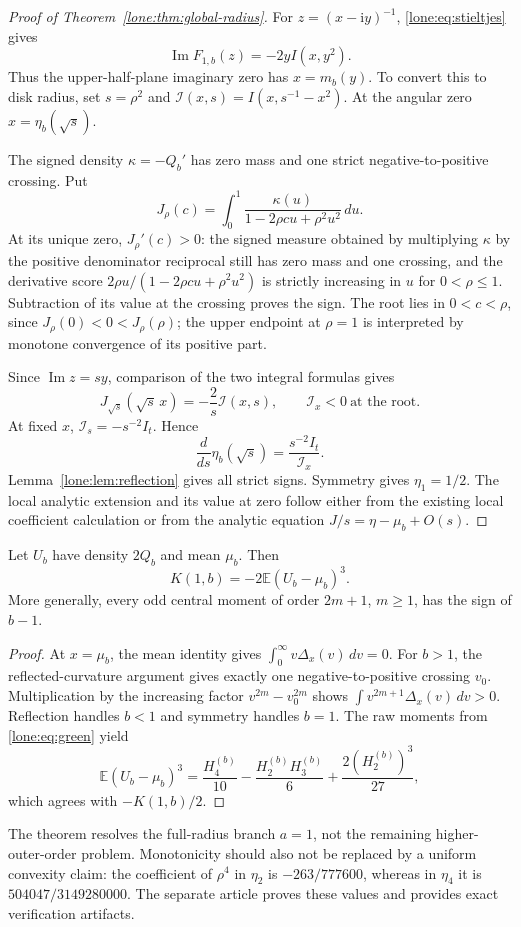 \begin{proof}[Proof of Theorem~\ref{lone:thm:global-radius}]
For $z=(x-\mathrm i y)^{-1}$, \eqref{lone:eq:stieltjes} gives
\[
 \operatorname{Im}F_{1,b}(z)=-2y I(x,y^2).
\]
Thus the upper-half-plane imaginary zero has $x=m_b(y)$.
To convert this to disk radius, set $s=\rho^2$ and
$\mathcal I(x,s)=I(x,s^{-1}-x^2)$. At the angular zero $x=\eta_b(\sqrt s)$.

The signed density $\kappa=-Q_b'$ has zero mass and one strict
negative-to-positive crossing. Put
\[
 J_\rho(c)=\int_0^1\frac{\kappa(u)}{1-2\rho cu+\rho^2u^2}\,du.
\]
At its unique zero, $J_\rho'(c)>0$: the signed measure obtained by
multiplying $\kappa$ by the positive denominator reciprocal still has
zero mass and one crossing, and the derivative score
$2\rho u/(1-2\rho cu+\rho^2u^2)$ is strictly increasing in $u$ for
$0<\rho\le1$. Subtraction of its value at the crossing proves the sign.
The root lies in $0<c<\rho$, since $J_\rho(0)<0<J_\rho(\rho)$;
the upper endpoint at $\rho=1$ is interpreted by monotone convergence
of its positive part.

Since $\operatorname{Im}z=sy$, comparison of the two integral formulas
gives
\[
 J_{\sqrt s}(\sqrt s\,x)=-\frac2s\mathcal I(x,s),
 \qquad \mathcal I_x<0\ \text{at the root}.
\]
At fixed $x$, $\mathcal I_s=-s^{-2}I_t$. Hence
\begin{equation}\label{lone:eq:radial-derivative}
 \frac d{ds}\eta_b(\sqrt s)=\frac{s^{-2}I_t}{\mathcal I_x}.
\end{equation}
Lemma~\ref{lone:lem:reflection} gives all strict signs. Symmetry gives
$\eta_1=1/2$. The local analytic extension and its value at zero follow
either from the existing local coefficient calculation or from the
analytic equation $J/s=\eta-\mu_b+O(s)$.
\end{proof}

\begin{corollary}
\label{lone:cor:moment}
Let $U_b$ have density $2Q_b$ and mean $\mu_b$. Then
\[
 K(1,b)=-2\mathbb E(U_b-\mu_b)^3.
\]
More generally, every odd central moment of order $2m+1$, $m\ge1$,
has the sign of $b-1$.
\end{corollary}
\begin{proof}
At $x=\mu_b$, the mean identity gives
$\int_0^\infty v\Delta_x(v)\,dv=0$. For $b>1$, the reflected-curvature
argument gives exactly one negative-to-positive crossing $v_0$.
Multiplication by the increasing factor $v^{2m}-v_0^{2m}$ shows
$\int v^{2m+1}\Delta_x(v)\,dv>0$. Reflection handles $b<1$ and symmetry
handles $b=1$. The raw moments from \eqref{lone:eq:green} yield
\[
 \mathbb E(U_b-\mu_b)^3
 =\frac{H_4^{(b)}}{10}
 -\frac{H_2^{(b)}H_3^{(b)}}6
 +\frac{2(H_2^{(b)})^3}{27},
\]
which agrees with $-K(1,b)/2$.
\end{proof}

\begin{remark}[Scope]
The theorem resolves the full-radius branch $a=1$, not the remaining
higher-outer-order problem. Monotonicity should also not be replaced
by a uniform convexity claim: the coefficient of $\rho^4$ in
$\eta_2$ is $-263/777600$, whereas in $\eta_4$ it is
$504047/3149280000$. The separate article proves these values and
provides exact verification artifacts.
\end{remark}
